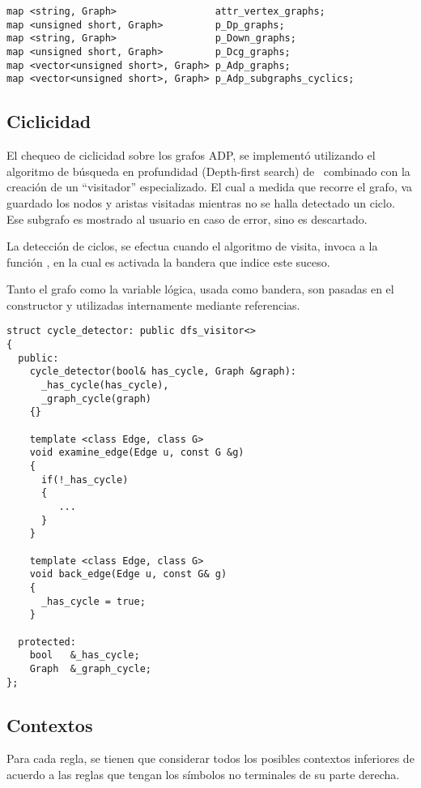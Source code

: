 \begin{lstlisting}[basicstyle=\scriptsize, linewidth=10.7cm]
map <string, Graph>                 attr_vertex_graphs;
map <unsigned short, Graph>         p_Dp_graphs;
map <string, Graph>                 p_Down_graphs;
map <unsigned short, Graph>         p_Dcg_graphs;
map <vector<unsigned short>, Graph> p_Adp_graphs;
map <vector<unsigned short>, Graph> p_Adp_subgraphs_cyclics;
\end{lstlisting}

\subsection{Ciclicidad}

El chequeo de ciclicidad sobre los grafos ADP, se implementó utilizando el algoritmo de búsqueda en profundidad (Depth-first search) de \boost\ combinado con la creación de un ``visitador'' especializado. El cual a medida que recorre el grafo, va guardado los nodos y aristas visitadas mientras no se halla detectado un ciclo. Ese subgrafo es mostrado al usuario en caso de error, sino es descartado.

La detección de ciclos, se efectua cuando el algoritmo de visita, invoca a la función , en la cual es activada la bandera que indice este suceso.

Tanto el grafo como la variable lógica, usada como bandera, son pasadas en el constructor y utilizadas internamente mediante referencias.

\begin{lstlisting}[columns=fullflexible, linewidth=9.2cm]
struct cycle_detector: public dfs_visitor<>
{
  public:
    cycle_detector(bool& has_cycle, Graph &graph):
      _has_cycle(has_cycle), 
      _graph_cycle(graph)
    {}

    template <class Edge, class G>
    void examine_edge(Edge u, const G &g)
    {
      if(!_has_cycle)
      {
         ...
      }
    }

    template <class Edge, class G>
    void back_edge(Edge u, const G& g)
    {
      _has_cycle = true;
    }

  protected:
    bool   &_has_cycle;
    Graph  &_graph_cycle;
};
\end{lstlisting}

\subsection{Contextos}

Para cada regla, se tienen que considerar todos los posibles contextos inferiores de acuerdo a las reglas que tengan los símbolos no terminales de su parte derecha.

